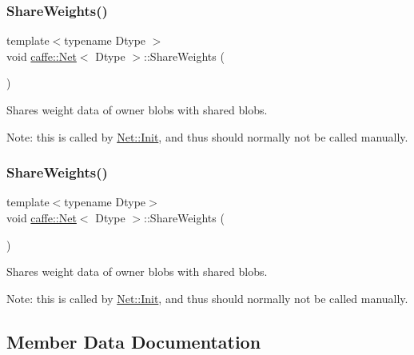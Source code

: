 \subsubsection{\texorpdfstring{Share\+Weights()}{ShareWeights()}\hspace{0.1cm}{\footnotesize\ttfamily [1/2]}}
{\footnotesize\ttfamily template$<$typename Dtype $>$ \\
void \mbox{\hyperlink{classcaffe_1_1_net}{caffe\+::\+Net}}$<$ Dtype $>$\+::Share\+Weights (\begin{DoxyParamCaption}{ }\end{DoxyParamCaption})}



Shares weight data of owner blobs with shared blobs. 

Note\+: this is called by \mbox{\hyperlink{classcaffe_1_1_net_ae9fcfaabc89165d6c0cb4b14b4c6b584}{Net\+::\+Init}}, and thus should normally not be called manually. \mbox{\label{classcaffe_1_1_net_a4850fdb3eea1b04c97642546c0dcccf7}} 
\subsubsection{\texorpdfstring{Share\+Weights()}{ShareWeights()}\hspace{0.1cm}{\footnotesize\ttfamily [2/2]}}
{\footnotesize\ttfamily template$<$typename Dtype$>$ \\
void \mbox{\hyperlink{classcaffe_1_1_net}{caffe\+::\+Net}}$<$ Dtype $>$\+::Share\+Weights (\begin{DoxyParamCaption}{ }\end{DoxyParamCaption})}



Shares weight data of owner blobs with shared blobs. 

Note\+: this is called by \mbox{\hyperlink{classcaffe_1_1_net_ae9fcfaabc89165d6c0cb4b14b4c6b584}{Net\+::\+Init}}, and thus should normally not be called manually. 

\subsection{Member Data Documentation}
\mbox{\label{classcaffe_1_1_net_a617731b68e56a18f7904d7d2322e6309}} 
